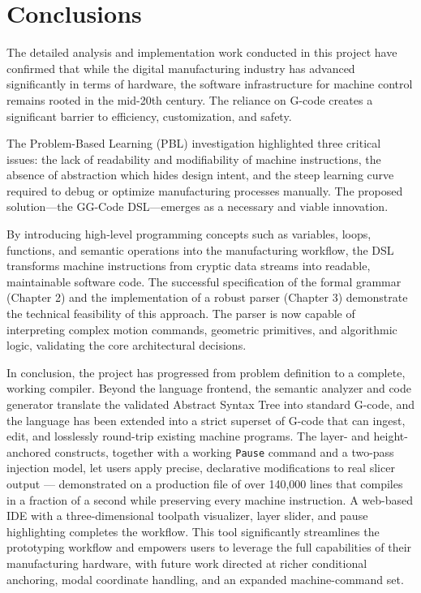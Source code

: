 \chapter*{Conclusions}

The detailed analysis and implementation work conducted in this project have confirmed that while the digital manufacturing industry has advanced significantly in terms of hardware, the software infrastructure for machine control remains rooted in the mid-20th century. The reliance on G-code creates a significant barrier to efficiency, customization, and safety.

The Problem-Based Learning (PBL) investigation highlighted three critical issues: the lack of readability and modifiability of machine instructions, the absence of abstraction which hides design intent, and the steep learning curve required to debug or optimize manufacturing processes manually. The proposed solution—the GG-Code DSL—emerges as a necessary and viable innovation.

By introducing high-level programming concepts such as variables, loops, functions, and semantic operations into the manufacturing workflow, the DSL transforms machine instructions from cryptic data streams into readable, maintainable software code. The successful specification of the formal grammar (Chapter 2) and the implementation of a robust parser (Chapter 3) demonstrate the technical feasibility of this approach. The parser is now capable of interpreting complex motion commands, geometric primitives, and algorithmic logic, validating the core architectural decisions.

In conclusion, the project has progressed from problem definition to a complete, working compiler. Beyond the language frontend, the semantic analyzer and code generator translate the validated Abstract Syntax Tree into standard G-code, and the language has been extended into a strict superset of G-code that can ingest, edit, and losslessly round-trip existing machine programs. The layer- and height-anchored constructs, together with a working \texttt{Pause} command and a two-pass injection model, let users apply precise, declarative modifications to real slicer output --- demonstrated on a production file of over 140{,}000 lines that compiles in a fraction of a second while preserving every machine instruction. A web-based IDE with a three-dimensional toolpath visualizer, layer slider, and pause highlighting completes the workflow. This tool significantly streamlines the prototyping workflow and empowers users to leverage the full capabilities of their manufacturing hardware, with future work directed at richer conditional anchoring, modal coordinate handling, and an expanded machine-command set.
